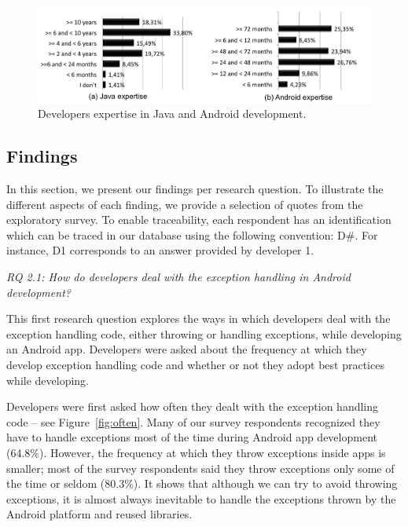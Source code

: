 \begin{figure} \centering \includegraphics[scale=0.38]{expertise_new.png}
\caption{Developers expertise in Java and Android development.}
\label{fig:devexpertise}
\end{figure}

\subsection{Findings}

In this section, we present our findings per research question. 
To illustrate the different aspects of each
finding, we provide a selection of quotes from the exploratory
survey. 
To enable traceability, each respondent has an identification
 which can be traced in our database using the following convention: 
D\#. For instance, D1 corresponds to an answer provided
 by developer 1.


\bigskip
\noindent\emph{RQ 2.1: How do developers deal with the exception handling in Android development?}
\bigskip

This first research question explores the ways in which developers deal with the exception handling code, either throwing or handling exceptions,  while developing an Android app.  Developers were asked about the frequency at which they develop exception handling code and whether or not they adopt best practices while developing.


Developers were first asked how often they dealt with the exception handling code -- see Figure~\ref{fig:often}. Many of our survey respondents recognized they have to handle exceptions most of the time during Android app development (64.8\%). However, the frequency at which they throw exceptions inside apps is smaller; most of the survey respondents said they throw exceptions only some of the time or seldom (80.3\%). It shows that although we can try to avoid throwing exceptions, it is almost always inevitable to handle the exceptions thrown by the Android platform and reused libraries. 

